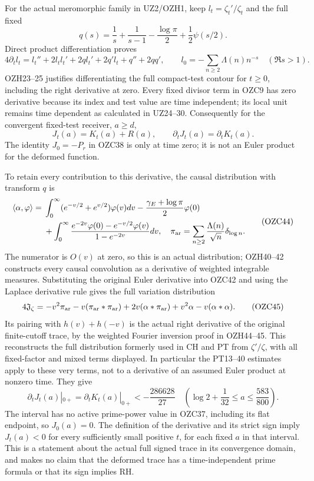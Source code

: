 \documentclass[
  10pt,
  a4paper,
]{article}
\begin{document}
For the actual meromorphic family in UZ2/OZH1, keep
\(l_t=\zeta_t'/\zeta_t\) and the full fixed \[
q(s)=\frac1s+\frac1{s-1}-\frac{\log\pi}{2}+\frac12\psi(s/2).
\] Direct product differentiation proves \[
4\partial_t l_t=l_t''+2l_tl_t'+2q l_t'+2q'l_t+q''+2qq',
\qquad l_0=-\sum_{n\ge2}\Lambda(n)n^{-s}\quad(\Re s>1).
\tag{OZC42}
\] OZH23--25 justifies differentiating the full compact-test contour for
\(t\ge0\), including the right derivative at zero. Every fixed divisor
term in OZC9 has zero derivative because its index and test value are
time independent; its local unit remains time dependent as calculated in
UZ24--30. Consequently for the convergent fixed-test receiver,
\(a\ge d\), \[
J_t(a)=K_t(a)+R(a),\qquad
\partial_tJ_t(a)=\partial_tK_t(a).
\tag{OZC43}
\] The identity \(J_0=-P_r\) in OZC38 is only at time zero; it is not an
Euler product for the deformed function.

To retain every contribution to this derivative, the causal distribution
with transform \(q\) is \[
\begin{aligned}
\langle\alpha,\varphi\rangle={}&
\int_0^\infty(e^{-v/2}+e^{v/2})\varphi(v)dv
-\frac{\gamma_E+\log\pi}{2}\varphi(0)\\
&+\int_0^\infty
\frac{e^{-2v}\varphi(0)-e^{-v/2}\varphi(v)}{1-e^{-2v}}dv,
\quad
\pi_{\rm ar}=\sum_{n\ge2}\frac{\Lambda(n)}{\sqrt n}\delta_{\log n}.
\end{aligned}
\tag{OZC44}
\] The numerator is \(O(v)\) at zero, so this is an actual distribution;
OZH40--42 constructs every causal convolution as a derivative of
weighted integrable measures. Substituting the original Euler derivative
into OZC42 and using the Laplace derivative rule gives the full
variation distribution \[
4\mathfrak J_\zeta=
-v^2\pi_{\rm ar}-v(\pi_{\rm ar}*\pi_{\rm ar})
+2v(\alpha*\pi_{\rm ar})+v^2\alpha-v(\alpha*\alpha).
\tag{OZC45}
\] Its pairing with \(h(v)+h(-v)\) is the actual right derivative of the
original finite-cutoff trace, by the weighted Fourier inversion proof in
OZH44--45. This reconstructs the full distribution formerly used in CH
and PT from \(\zeta'/\zeta\), with all fixed-factor and mixed terms
displayed. In particular the PT13--40 estimates apply to these very
terms, not to a derivative of an assumed Euler product at nonzero time.
They give \[
\partial_tJ_t(a)|_{0+}=\partial_tK_t(a)|_{0+}
<-\frac{286628}{27}
\quad\left(\log2+\frac1{32}\le a\le\frac{583}{800}\right).
\tag{OZC46}
\] The interval has no active prime-power value in OZC37, including its
flat endpoint, so \(J_0(a)=0\). The definition of the derivative and its
strict sign imply \(J_t(a)<0\) for every sufficiently small positive
\(t\), for each fixed \(a\) in that interval. This is a statement about
the actual full signed trace in its convergence domain, and makes no
claim that the deformed trace has a time-independent prime formula or
that its sign implies RH.
\end{document}
